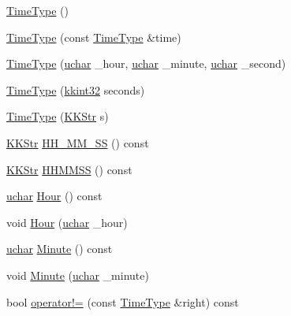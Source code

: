 \begin{DoxyCompactItemize}
\item 
\hyperlink{class_k_k_b_1_1_time_type_a06c2d905bb31f27af46532d71b74ea9d}{Time\+Type} ()
\item 
\hyperlink{class_k_k_b_1_1_time_type_a80d3009affcea7372580051ad145b5cd}{Time\+Type} (const \hyperlink{class_k_k_b_1_1_time_type}{Time\+Type} \&time)
\item 
\hyperlink{class_k_k_b_1_1_time_type_a8923dec069fefa221aefc9b42c37bdae}{Time\+Type} (\hyperlink{namespace_k_k_b_ace9969169bf514f9ee6185186949cdf7}{uchar} \+\_\+hour, \hyperlink{namespace_k_k_b_ace9969169bf514f9ee6185186949cdf7}{uchar} \+\_\+minute, \hyperlink{namespace_k_k_b_ace9969169bf514f9ee6185186949cdf7}{uchar} \+\_\+second)
\item 
\hyperlink{class_k_k_b_1_1_time_type_a8e9f334bee41dac5a6f0b3c1e5ff7d90}{Time\+Type} (\hyperlink{namespace_k_k_b_a8fa4952cc84fda1de4bec1fbdd8d5b1b}{kkint32} seconds)
\item 
\hyperlink{class_k_k_b_1_1_time_type_a9bdbbb67b363be876daac807ded541b7}{Time\+Type} (\hyperlink{class_k_k_b_1_1_k_k_str}{K\+K\+Str} s)
\item 
\hyperlink{class_k_k_b_1_1_k_k_str}{K\+K\+Str} \hyperlink{class_k_k_b_1_1_time_type_a120d19c3fcb1105e6e2c93a969ccc92e}{H\+H\+\_\+\+M\+M\+\_\+\+SS} () const 
\item 
\hyperlink{class_k_k_b_1_1_k_k_str}{K\+K\+Str} \hyperlink{class_k_k_b_1_1_time_type_a07c629b3910b9799408e853f27945244}{H\+H\+M\+M\+SS} () const 
\item 
\hyperlink{namespace_k_k_b_ace9969169bf514f9ee6185186949cdf7}{uchar} \hyperlink{class_k_k_b_1_1_time_type_a11b31ed39738ea8b9885e05f53b8a07c}{Hour} () const 
\item 
void \hyperlink{class_k_k_b_1_1_time_type_a77aee813ef448993d6ebc96d7793fb66}{Hour} (\hyperlink{namespace_k_k_b_ace9969169bf514f9ee6185186949cdf7}{uchar} \+\_\+hour)
\item 
\hyperlink{namespace_k_k_b_ace9969169bf514f9ee6185186949cdf7}{uchar} \hyperlink{class_k_k_b_1_1_time_type_aef6fa51f14cb1dd0876bd01340186c37}{Minute} () const 
\item 
void \hyperlink{class_k_k_b_1_1_time_type_a2e1bb9f27f7f785075c48a4f8556283b}{Minute} (\hyperlink{namespace_k_k_b_ace9969169bf514f9ee6185186949cdf7}{uchar} \+\_\+minute)
\item 
bool \hyperlink{class_k_k_b_1_1_time_type_a31930681d50ef32c54774c75e0dcf420}{operator!=} (const \hyperlink{class_k_k_b_1_1_time_type}{Time\+Type} \&right) const 

\end{DoxyCompactItemize}

